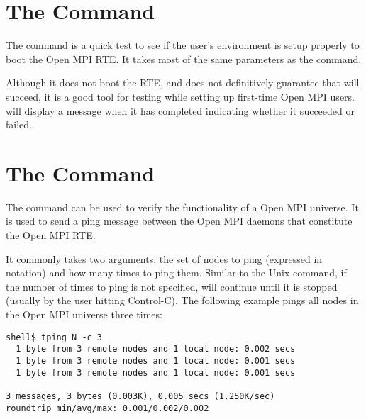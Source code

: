 
\section{The  Command}
\label{sec:commands-recon}

The  command is a quick test to see if the user's
environment is setup properly to boot the Open MPI RTE.  It takes most of
the same parameters as the  command.

Although it does not boot the RTE, and does not definitively guarantee
that  will succeed, it is a good tool for testing while
setting up first-time Open MPI users.   will display a
message when it has completed indicating whether it succeeded or
failed.


\section{The  Command}
\label{sec:commands-tping}

The  command can be used to verify the functionality of a
Open MPI universe.  It is used to send a ping message between the Open MPI
daemons that constitute the Open MPI RTE.  

It commonly takes two arguments: the set of nodes to ping (expressed
in  notation) and how many times to ping them.  Similar to the
Unix  command, if the number of times to ping is not
specified,  will continue until it is stopped (usually by
the user hitting Control-C).  The following example pings all nodes in
the Open MPI universe three times:

\lstset{style=lam-cmdline}
\begin{lstlisting}
shell$ tping N -c 3
  1 byte from 3 remote nodes and 1 local node: 0.002 secs
  1 byte from 3 remote nodes and 1 local node: 0.001 secs
  1 byte from 3 remote nodes and 1 local node: 0.001 secs

3 messages, 3 bytes (0.003K), 0.005 secs (1.250K/sec)
roundtrip min/avg/max: 0.001/0.002/0.002
\end{lstlisting}

